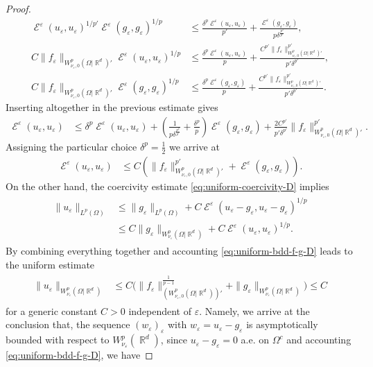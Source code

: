 \documentclass[12pt, reqno]{amsart}%
\theoremstyle{plain}  %
\theoremstyle{definition}  %
\numberwithin{equation}{section}
\DeclareMathOperator{\cE}{\mathcal{E}}
\DeclareMathOperator{\R}{\mathbb{R}}
\newcommand{\eps}{\varepsilon}
\newcommand{\WnuOmRa}{W^p_{\nu_\eps}(\Omega|\R^d )}
\newcommand{\WnuOmRao}{W^p_{\nu_\eps,0}(\Omega|\R^d)}
\begin{document}
\begin{proof}
\begin{align*}
\cE^\eps(u_\eps,u_\eps)^{1/p'}\cE^\eps(g_\eps,g_\eps)^{1/p}
&\leq  \frac{\delta^{p}\cE^\eps(u_\eps,u_\eps)}{p'}+ \frac{\cE^\eps(g_\eps,g_\eps)}{p\delta^{\frac{p^2}{p'}}},\\
%
C\|f_\eps\|_{\WnuOmRao'} \cE^\eps(u_\eps,u_\eps)^{1/p}
&\leq  \frac{\delta^p\cE^\eps(u_\eps,u_\eps)}{p}+ \frac{C^{p'}\|f_\eps\|_{\WnuOmRao'} ^{p'}}{p'\delta^{p'}},\\
%
C\|f_\eps\|_{\WnuOmRao'}\cE^\eps(g_\eps,g_\eps)^{1/p}
&\leq \frac{\delta^{p}\cE^\eps(g_\eps,g_\eps)}{p} + \frac{C^{p'}\|f_\eps\|_{\WnuOmRao'} ^{p'}}{p'\delta^{p'}}.
\end{align*}
Inserting altogether in the previous estimate gives
\begin{align*}
\cE^\eps(u_\eps,u_\eps)
&\leq 	 \delta^{p}\cE^\eps(u_\eps,u_\eps) + ( \frac{1}{p\delta^{\frac{p^2}{p'}}}+ \frac{\delta^{p}}{p}) \cE^\eps(g_\eps,g_\eps)
+ \frac{2C^{p'}}{p'\delta^{p'}} \|f_\eps\|_{\WnuOmRao'} ^{p'}.
\end{align*}
\noindent Assigning the  particular choice  $\delta^p=\frac12$ we arrive at
\begin{align*}
\cE^\eps(u_\eps,u_\eps)&\leq C(\|f_\eps\|_{\WnuOmRao'} ^{p'} + \cE^\eps(g_\eps,g_\eps)) .
\end{align*}
On the other hand, the coercivity estimate \eqref{eq:uniform-coercivity-D} implies
\begin{align}\label{eq:xlp-bound-dirich}
\begin{split}
\|u_\eps\|_{L^p(\Omega)}
&\leq  \|g_\eps\|_{L^p(\Omega)}+ C\cE^\eps(u_\eps-g_\eps,u_\eps-g_\eps)^{1/p}\\
&\leq C\|g_\eps\|_{\WnuOmRa }+ C\cE^\eps(u_\eps,u_\eps)^{1/p}.
\end{split}
\end{align}
By combining everything together and accounting \eqref{eq:uniform-bdd-f-g-D}  leads to the uniform estimate
\begin{align}\label{eq:unifo-bdedness-D}
\begin{split}
\|u_\eps\|_{\WnuOmRa}
&\leq C\big(\|f_\eps \|^{\frac{1}{p-1}}_{(\WnuOmRao)'}+\|g_\eps \|_{\WnuOmRa}\big)
\leq C
\end{split}
\end{align}
for a generic  constant  $C>0$ independent of $\eps$. Namely, we arrive at the conclusion that, the sequence $(w_\eps)_\eps$ with $w_\eps= u_\eps-g_\eps$ is asymptotically bounded  with respect to $W^p_{\nu_{\eps}}(\R^d)$, since $u_\eps-g_\eps=0$ a.e. on $\Omega^c$ and accounting  \eqref{eq:uniform-bdd-f-g-D},  we have

\end{proof}
\end{document}
